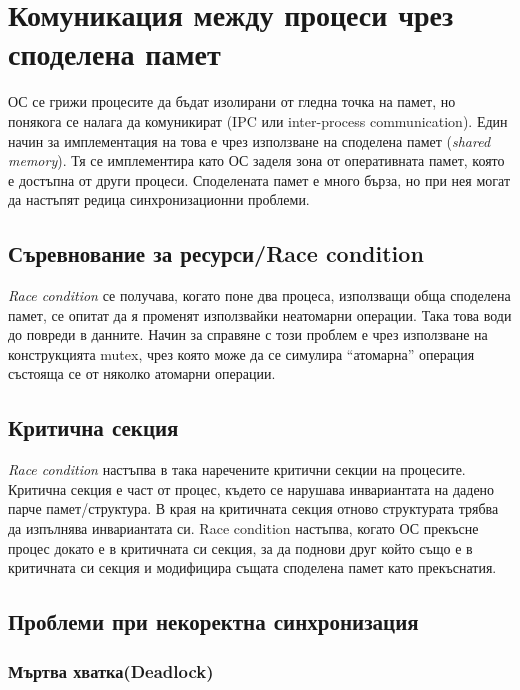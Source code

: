 \documentclass[fleqn,12pt]{article}
\begin{document}
\section{Комуникация между процеси чрез споделена памет}

ОС се грижи процесите да бъдат изолирани от гледна точка на памет, но понякога се налага да комуникират (IPC или inter-process communication).
Един начин за имплементация на това е чрез използване на споделена памет (\textit{shared memory}).
Тя се имплементира като ОС заделя зона от оперативната памет, която е достъпна от други процеси.
Споделената памет е много бърза, но при нея могат да настъпят редица синхронизационни проблеми.

\subsection{Съревнование за ресурси/Race condition}

\textit{Race condition} се получава, когато поне два процеса, използващи обща споделена памет, се опитат да я променят използвайки неатомарни операции.
Така това води до повреди в данните.
Начин за справяне с този проблем е чрез използване на конструкцията mutex, чрез която може да се симулира ``атомарна'' операция състояща се от няколко атомарни операции.

\subsection{Критична секция}

\textit{Race condition} настъпва в така наречените критични секции на процесите.
Критична секция е част от процес, където се нарушава инвариантата на дадено парче памет/структура.
В края на критичната секция отново структурата трябва да изпълнява инвариантата си.
Race condition настъпва, когато ОС прекъсне процес докато е в критичната си секция, за да поднови друг който също е в критичната си секция и модифицира същата споделена памет като прекъснатия.

\subsection{Проблеми при некоректна синхронизация}


\subsubsection{Мъртва хватка(Deadlock)}
\end{document}
